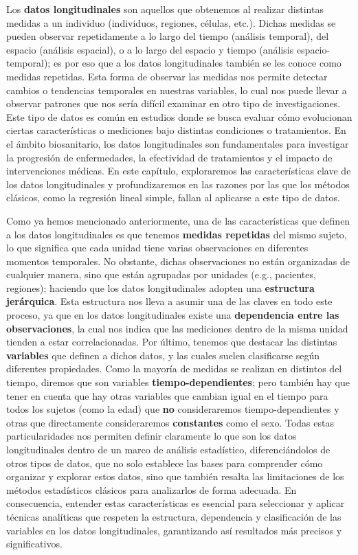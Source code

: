 \documentclass[
  letterpaper,
  DIV=11,
  numbers=noendperiod]{scrreprt}
\begin{document}
Los \textbf{datos longitudinales} son aquellos que obtenemos al realizar
distintas medidas a un individuo (individuos, regiones, células, etc.).
Dichas medidas se pueden observar repetidamente a lo largo del tiempo
(análisis temporal), del espacio (análisis espacial), o a lo largo del
espacio y tiempo (análisis espacio-temporal); es por eso que a los datos
longitudinales también se les conoce como medidas repetidas. Esta forma
de observar las medidas nos permite detectar cambios o tendencias
temporales en nuestras variables, lo cual nos puede llevar a observar
patrones que nos sería difícil examinar en otro tipo de investigaciones.
Este tipo de datos es común en estudios donde se busca evaluar cómo
evolucionan ciertas características o mediciones bajo distintas
condiciones o tratamientos. En el ámbito biosanitario, los datos
longitudinales son fundamentales para investigar la progresión de
enfermedades, la efectividad de tratamientos y el impacto de
intervenciones médicas. En este capítulo, exploraremos las
características clave de los datos longitudinales y profundizaremos en
las razones por las que los métodos clásicos, como la regresión lineal
simple, fallan al aplicarse a este tipo de datos.

Como ya hemos mencionado anteriormente, una de las características que
definen a los datos longitudinales es que tenemos \textbf{medidas
repetidas} del mismo sujeto, lo que significa que cada unidad tiene
varias observaciones en diferentes momentos temporales. No obstante,
dichas observaciones no están organizadas de cualquier manera, sino que
están agrupadas por unidades (e.g., pacientes, regiones); haciendo que
los datos longitudinales adopten una \textbf{estructura jerárquica}.
Esta estructura nos lleva a asumir una de las claves en todo este
proceso, ya que en los datos longitudinales existe una
\textbf{dependencia entre las observaciones}, la cual nos indica que las
mediciones dentro de la misma unidad tienden a estar correlacionadas.
Por último, tenemos que destacar las distintas \textbf{variables} que
definen a dichos datos, y las cuales suelen clasificarse según
diferentes propiedades. Como la mayoría de medidas se realizan en
distintos del tiempo, diremos que son variables
\textbf{tiempo-dependientes}; pero también hay que tener en cuenta que
hay otras variables que cambian igual en el tiempo para todos los
sujetos (como la edad) que \textbf{no} consideraremos
tiempo-dependientes y otras que directamente consideraremos
\textbf{constantes} como el sexo. Todas estas particularidades nos
permiten definir claramente lo que son los datos longitudinales dentro
de un marco de análisis estadístico, diferenciándolos de otros tipos de
datos, que no solo establece las bases para comprender cómo organizar y
explorar estos datos, sino que también resalta las limitaciones de los
métodos estadísticos clásicos para analizarlos de forma adecuada. En
consecuencia, entender estas características es esencial para
seleccionar y aplicar técnicas analíticas que respeten la estructura,
dependencia y clasificación de las variables en los datos
longitudinales, garantizando así resultados más precisos y
significativos.
\end{document}

